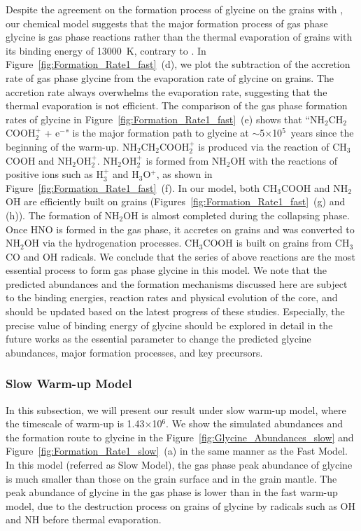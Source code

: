 \documentclass{aastex61}
\begin{document}
Despite the agreement on the formation process of glycine on the grains with \cite{Garrod13}, our chemical model suggests that the major formation process of gas phase glycine is gas phase reactions rather than the thermal evaporation of grains with its binding energy of 13000~K, contrary to \cite{Garrod13}.
%
In Figure~\ref{fig:Formation_Rate1_fast}~(d), we plot the subtraction of the accretion rate of gas phase glycine from the evaporation rate of glycine on grains.
%
The accretion rate always overwhelms the evaporation rate, suggesting that the thermal evaporation is not efficient.
%
The comparison of the gas phase formation rates of glycine in Figure~\ref{fig:Formation_Rate1_fast}~(e) shows that ``NH$_2$CH$_2$COOH$_2^+$ + e$^-$" is the major formation path to glycine at $\sim$5$\times$10$^5$~years since the beginning of the warm-up.
%
NH$_2$CH$_2$COOH$_2^+$ is produced via the reaction of CH$_3$COOH and NH$_2$OH$_2^+$.
%
NH$_2$OH$_2^+$ is formed from NH$_2$OH with the reactions of positive ions such as H$_3^+$ and H$_3$O$^+$, as shown in Figure~\ref{fig:Formation_Rate1_fast}~(f).
%
In our model, both CH$_3$COOH and NH$_2$OH are efficiently built on grains (Figures~\ref{fig:Formation_Rate1_fast}~(g) and (h)).
%
The formation of NH$_2$OH is almost completed during the collapsing phase.
%
Once HNO is formed in the gas phase, it accretes on grains and was converted to NH$_2$OH via the hydrogenation processes.
%
CH$_3$COOH is built on grains from CH$_3$CO and OH radicals.
%
We conclude that the series of above reactions are the most essential process to form gas phase glycine in this model.
%
We note that the predicted abundances and the formation mechanisms discussed here are subject to the binding energies, reaction rates and physical evolution of the core, and should be updated based on the latest progress of these studies.
%
Especially, the precise value of binding energy of glycine should be explored in detail in the future works as the essential parameter to change the predicted glycine abundances, major formation processes, and key precursors.


\subsubsection{Slow Warm-up Model}
In this subsection, we will present our result under slow warm-up model, where the timescale of warm-up is 1.43$\times$10$^{6}$.
%
We show the simulated abundances and the formation route to glycine in the Figure~\ref{fig:Glycine_Abundances_slow} and Figure~\ref{fig:Formation_Rate1_slow}~(a) in the same manner as the Fast Model.
%
In this model (referred as Slow Model), the gas phase peak abundance of glycine is much smaller than those on the grain surface and in the grain mantle.
%
The peak abundance of glycine in the gas phase is lower than in the fast warm-up model, due to the destruction process on grains of glycine by radicals such as OH and NH before thermal evaporation.
\end{document}
